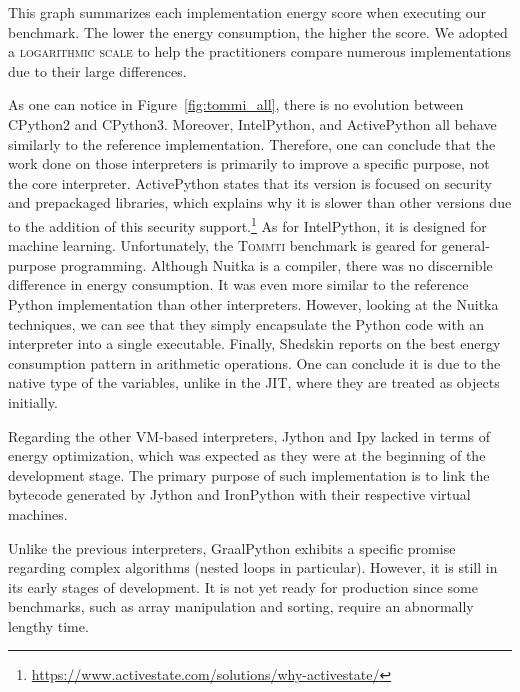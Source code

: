This graph summarizes each implementation energy score when executing our benchmark.
The lower the energy consumption, the higher the score.
We adopted a \textsc{logarithmic scale} to help the practitioners compare numerous implementations due to their large differences.


As one can notice in Figure~\ref{fig:tommi_all}, there is no evolution between CPython2 and CPython3.
Moreover, IntelPython, and ActivePython all behave similarly to the reference implementation.
Therefore, one can conclude that the work done on those interpreters is primarily to improve a specific purpose, not the core interpreter.
ActivePython states that its version is focused on security and prepackaged libraries, which explains why it is slower than other versions due to the addition of this security support.\footnote{\url{https://www.activestate.com/solutions/why-activestate/}}
As for IntelPython, it is designed for machine learning.
Unfortunately, the \textsc{Tommti} benchmark is geared for general-purpose programming.
Although Nuitka is a compiler, there was no discernible difference in energy consumption.
It was even more similar to the reference Python implementation than other interpreters.
However, looking at the Nuitka techniques, we can see that they simply encapsulate the Python code with an interpreter into a single executable.
Finally, Shedskin reports on the best energy consumption pattern in arithmetic operations.
One can conclude it is due to the native type of the variables, unlike in the JIT, where they are treated as objects initially.

Regarding the other VM-based interpreters, Jython and Ipy lacked in terms of energy optimization, which was expected as they were at the beginning of the development stage. The primary purpose of such implementation is to link the bytecode generated by Jython and IronPython with their respective virtual machines.

Unlike the previous interpreters, GraalPython exhibits a specific promise regarding complex algorithms (nested loops in particular). However, it is still in its early stages of development. It is not yet ready for production since some benchmarks, such as array manipulation and sorting, require an abnormally lengthy time. 





